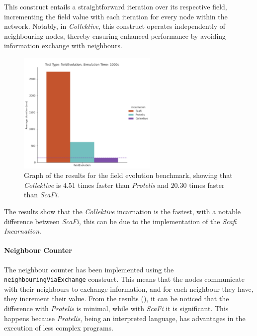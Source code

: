 This construct entails a straightforward iteration over its respective field, incrementing the field value with each
iteration for every node within the network.
Notably, in \emph{Collektive}, this construct operates independently of neighbouring nodes, thereby ensuring enhanced
performance by avoiding information exchange with neighbours.

\begin{figure}[ht!]
    \centering
    \includegraphics[width=0.6\textwidth]{figures/field-evolution-results}
    \caption{Graph of the results for the field evolution benchmark, showing that \emph{Collektive} is $4.51$ times faster
        than \emph{Protelis} and $20.30$ times faster than \emph{ScaFi}.}
    \label{fig:field-evolution}
\end{figure}

The results show that the \emph{Collektive} incarnation is the fastest, with a notable difference between \emph{ScaFi},
this can be due to the implementation of the \emph{Scafi Incarnation}.

\paragraph{Neighbour Counter}
The neighbour counter has been implemented using the \texttt{neighbouringViaExchange} construct.
This means that the nodes communicate with their neighbours to exchange information, and for each neighbour they have, they
increment their value.
From the results (), it can be noticed that the difference with \emph{Protelis} is minimal,
while with \emph{ScaFi} it is significant.
This happens because \emph{Protelis}, being an interpreted language, has advantages in the execution of less complex programs.

